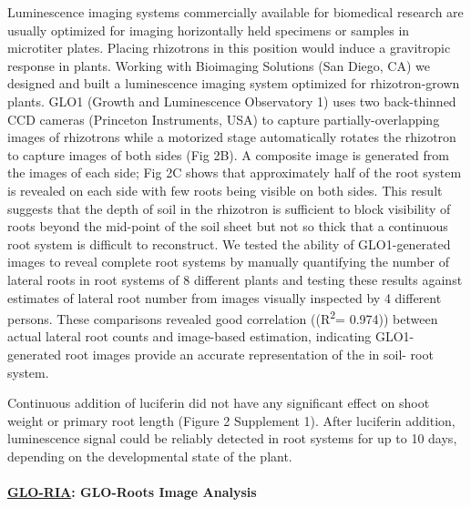 \documentclass[]{article}
\begin{document}
Luminescence imaging systems commercially available for biomedical
research are usually optimized for imaging horizontally held specimens
or samples in microtiter plates. Placing rhizotrons in this position
would induce a gravitropic response in plants. Working with Bioimaging
Solutions (San Diego, CA) we designed and built a luminescence imaging
system optimized for rhizotron-grown plants. GLO1 (Growth and
Luminescence Observatory 1) uses two back-thinned CCD cameras (Princeton
Instruments, USA) to capture partially-overlapping images of rhizotrons
while a motorized stage automatically rotates the rhizotron to capture
images of both sides (Fig 2B). A composite image is generated from the
images of each side; Fig 2C shows that approximately half of the root
system is revealed on each side with few roots being visible on both
sides. This result suggests that the depth of soil in the rhizotron is
sufficient to block visibility of roots beyond the mid-point of the soil
sheet but not so thick that a continuous root system is difficult to
reconstruct. We tested the ability of GLO1-generated images to reveal
complete root systems by manually quantifying the number of lateral
roots in root systems of 8 different plants and testing these results
against estimates of lateral root number from images visually inspected
by 4 different persons. These comparisons revealed good correlation
((R\textsuperscript{2}= 0.974)) between actual lateral root counts and
image-based estimation, indicating GLO1-generated root images provide an
accurate representation of the in soil- root system.

Continuous addition of luciferin did not have any significant effect on
shoot weight or primary root length (Figure 2 Supplement 1). After
luciferin addition, luminescence signal could be reliably detected in
root systems for up to 10 days, depending on the developmental state of
the plant.

\paragraph{\texorpdfstring{\href{https://www.dropbox.com/s/ji41jq3276vk1n5/GLO_RIA_manual.pdf?dl=0}{GLO-RIA}:
GLO-Roots Image
Analysis}{GLO-RIA: GLO-Roots Image Analysis}}\label{glo-ria-glo-roots-image-analysis}
\end{document}
